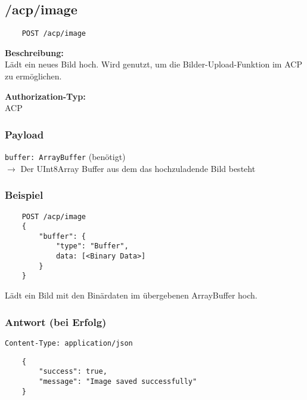 \subsection{/acp/image}
\label{acpimage}

\begin{lstlisting}
    POST /acp/image
\end{lstlisting}

\textbf{Beschreibung:} \\
Lädt ein neues Bild hoch. Wird genutzt, um die Bilder-Upload-Funktion im ACP zu ermöglichen.

\textbf{Authorization-Typ:} \\
ACP

\subsubsection{Payload}

\lstinline{buffer: ArrayBuffer} (benötigt) \\
$\rightarrow$ Der UInt8Array Buffer aus dem das hochzuladende Bild besteht

\subsubsection{Beispiel}

\begin{lstlisting}
    POST /acp/image
    {
        "buffer": {
            "type": "Buffer",
            data: [<Binary Data>]
        } 
    }
\end{lstlisting}

Lädt ein Bild mit den Binärdaten im übergebenen ArrayBuffer hoch.

\subsubsection{Antwort (bei Erfolg)}

\lstinline{Content-Type: application/json}
\begin{lstlisting}
    {
        "success": true, 
        "message": "Image saved successfully"
    }
\end{lstlisting}
